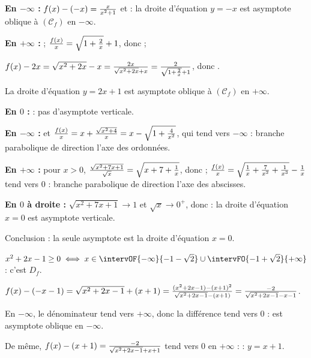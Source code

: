 \collerici
\begin{corrigeprof}[18]
\be
\item \be
	\item[(a)] \textbf{En $-\infty$ :} $f(x)-(-x)=\frac{x}{x^2+1}$ et  : la droite d'équation $y=-x$ est asymptote oblique à $(\mathcal{C}_f)$ en $-\infty$.
	\par \textbf{En $+\infty$ :}  ; $\frac{f(x)}{x}=\sqrt{1+\frac{2}{x}}+1$, donc  ;
	\par $f(x)-2x=\sqrt{x^2+2x}-x=\frac{2x}{\sqrt{x^2+2x}+x}=\frac{2}{\sqrt{1+\frac{2}{x}}+1}$, donc .
	\par La droite d'équation $y=2x+1$ est asymptote oblique à $(\mathcal{C}_f)$ en $+\infty$.
	\par \textbf{En $0$ :}  : pas d'asymptote verticale.
	\item[(b)] \textbf{En $-\infty$ :}  et $\frac{f(x)}{x}=x+\frac{\sqrt{x^2+4}}{x}=x-\sqrt{1+\frac{4}{x^2}}$, qui tend vers $-\infty$ : branche parabolique de direction l'axe des ordonnées.
	\par \textbf{En $+\infty$ :} pour $x>0$, $\frac{\sqrt{x^2+7x+1}}{\sqrt x}=\sqrt{x+7+\frac{1}{x}}$, donc  ; $\frac{f(x)}{x}=\sqrt{\frac{1}{x}+\frac{7}{x^2}+\frac{1}{x^3}}-\frac{1}{x}$ tend vers $0$ : branche parabolique de direction l'axe des abscisses.
	\par \textbf{En $0$ à droite :} $\sqrt{x^2+7x+1}\to 1$ et $\sqrt x\to 0^+$, donc  : la droite d'équation $x=0$ est asymptote verticale.
	\par Conclusion : la seule asymptote est la droite d'équation $x=0$.
\ee
\item $x^2+2x-1\geq 0\iff x\in\intervOF{-\infty}{-1-\sqrt2}\cup\intervFO{-1+\sqrt2}{+\infty}$ : c'est $D_f$.
\be \item $f(x)-(-x-1)=\sqrt{x^2+2x-1}+(x+1)=\frac{(x^2+2x-1)-(x+1)^2}{\sqrt{x^2+2x-1}-(x+1)}=\frac{-2}{\sqrt{x^2+2x-1}-x-1}$.
	\par En $-\infty$, le dénominateur tend vers $+\infty$, donc la différence tend vers $0$ :  est asymptote oblique en $-\infty$.
	\item De même, $f(x)-(x+1)=\frac{-2}{\sqrt{x^2+2x-1}+x+1}$ tend vers $0$ en $+\infty$ :  : $y=x+1$.\ee
\ee
\end{corrigeprof}
